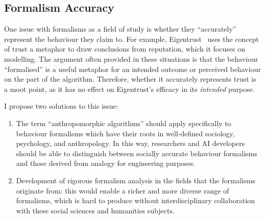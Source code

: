 \subsection{Formalism Accuracy}
One issue with formalisms as a field of study is whether they ``accurately'' represent the behaviour they claim to. For example, Eigentrust~\citep{eigentrust} uses the concept of trust a metaphor to draw conclusions from reputation, which it focuses on modelling. The argument often provided in these situations is that the behaviour ``formalised'' is a useful metaphor for an intended outcome or perceived behaviour on the part of the algorithm. Therefore, whether it accurately represents trust is a moot point, as it has no effect on Eigentrust's efficacy in its \emph{intended} purpose.\par

I propose two solutions to this issue:

\begin{enumerate}
  \item The term ``anthropomorphic algorithms'' should apply specifically to behaviour formalisms which have their roots in well-defined sociology, psychology, and anthropology. In this way, researchers and AI developers should be able to distinguish between socially accurate behaviour formalisms and those derived from analogy for engineering purposes.
  \item Development of rigorous formalism analysis in the fields that the formalisms originate from: this would enable a richer and more diverse range of formalisms, which is hard to produce without interdisciplinary collaboration with these social sciences and humanities subjects.
\end{enumerate}


